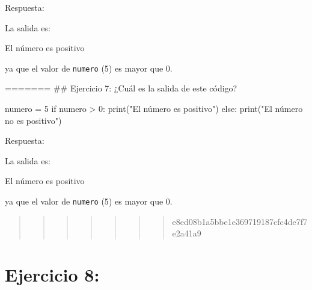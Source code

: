\documentclass[
  a4paper,
  DIV=11,
  numbers=noendperiod,
  onepage,
  openany]{scrreprt}
\newenvironment{Shaded}{\begin{snugshade}}{\end{snugshade}}
\newcommand{\BuiltInTok}[1]{\textcolor[rgb]{0.00,0.23,0.31}{#1}}
\newcommand{\ControlFlowTok}[1]{\textcolor[rgb]{0.00,0.23,0.31}{#1}}
\newcommand{\DecValTok}[1]{\textcolor[rgb]{0.68,0.00,0.00}{#1}}
\newcommand{\ExtensionTok}[1]{\textcolor[rgb]{0.00,0.23,0.31}{#1}}
\newcommand{\NormalTok}[1]{\textcolor[rgb]{0.00,0.23,0.31}{#1}}
\newcommand{\OperatorTok}[1]{\textcolor[rgb]{0.37,0.37,0.37}{#1}}
\newcommand{\StringTok}[1]{\textcolor[rgb]{0.13,0.47,0.30}{#1}}
\begin{document}
Respuesta:

La salida es:

\begin{Shaded}
\begin{Highlighting}[]
\ExtensionTok{El}\NormalTok{ número es positivo}
\end{Highlighting}
\end{Shaded}

ya que el valor de \texttt{numero} (5) es mayor que 0.

======= \#\# Ejercicio 7: ¿Cuál es la salida de este código?

\begin{Shaded}
\begin{Highlighting}[]
\NormalTok{numero }\OperatorTok{=} \DecValTok{5}
\ControlFlowTok{if}\NormalTok{ numero }\OperatorTok{\textgreater{}} \DecValTok{0}\NormalTok{:}
    \BuiltInTok{print}\NormalTok{(}\StringTok{"El número es positivo"}\NormalTok{)}
\ControlFlowTok{else}\NormalTok{:}
    \BuiltInTok{print}\NormalTok{(}\StringTok{"El número no es positivo"}\NormalTok{)}
\end{Highlighting}
\end{Shaded}

Respuesta:

La salida es:

\begin{Shaded}
\begin{Highlighting}[]
\ExtensionTok{El}\NormalTok{ número es positivo}
\end{Highlighting}
\end{Shaded}

ya que el valor de \texttt{numero} (5) es mayor que 0.

\begin{quote}
\begin{quote}
\begin{quote}
\begin{quote}
\begin{quote}
\begin{quote}
\begin{quote}
e8ed08b1a5bbe1e369719187cfc4de7f7e2a41a9
\end{quote}
\end{quote}
\end{quote}
\end{quote}
\end{quote}
\end{quote}
\end{quote}

\hypertarget{ejercicio-8}{%
\chapter{Ejercicio 8:}\label{ejercicio-8}}
\end{document}
